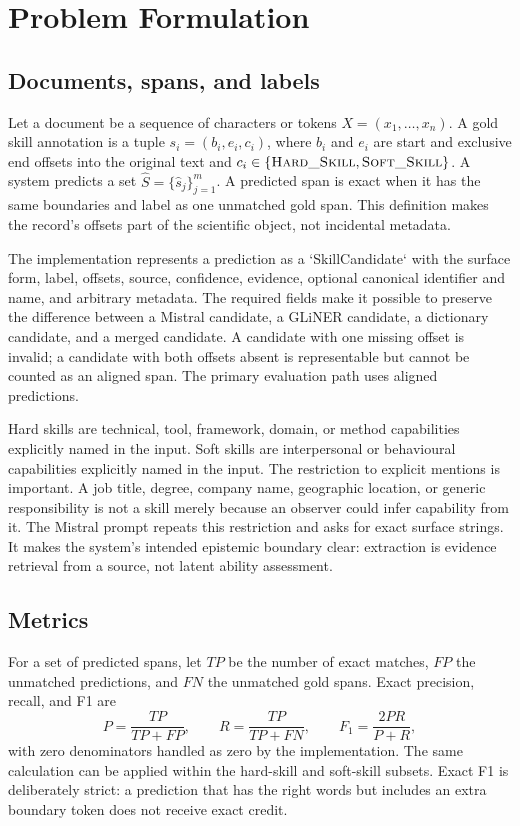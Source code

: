 \chapter{Problem Formulation}
\label{ch:problem}

\section{Documents, spans, and labels}

Let a document be a sequence of characters or tokens $X=(x_1,\ldots,x_n)$. A gold skill annotation is a tuple $s_i=(b_i,e_i,c_i)$, where $b_i$ and $e_i$ are start and exclusive end offsets into the original text and $c_i\in\{\textsc{Hard\_Skill},\textsc{Soft\_Skill}\}$. A system predicts a set $\widehat{S}=\{\hat{s}_j\}_{j=1}^{m}$. A predicted span is exact when it has the same boundaries and label as one unmatched gold span. This definition makes the record's offsets part of the scientific object, not incidental metadata.

The implementation represents a prediction as a `SkillCandidate` with the surface form, label, offsets, source, confidence, evidence, optional canonical identifier and name, and arbitrary metadata. The required fields make it possible to preserve the difference between a Mistral candidate, a GLiNER candidate, a dictionary candidate, and a merged candidate. A candidate with one missing offset is invalid; a candidate with both offsets absent is representable but cannot be counted as an aligned span. The primary evaluation path uses aligned predictions.

Hard skills are technical, tool, framework, domain, or method capabilities explicitly named in the input. Soft skills are interpersonal or behavioural capabilities explicitly named in the input. The restriction to explicit mentions is important. A job title, degree, company name, geographic location, or generic responsibility is not a skill merely because an observer could infer capability from it. The Mistral prompt repeats this restriction and asks for exact surface strings. It makes the system's intended epistemic boundary clear: extraction is evidence retrieval from a source, not latent ability assessment.

\section{Metrics}

For a set of predicted spans, let $TP$ be the number of exact matches, $FP$ the unmatched predictions, and $FN$ the unmatched gold spans. Exact precision, recall, and F1 are
\begin{equation}
 P=\frac{TP}{TP+FP},\qquad R=\frac{TP}{TP+FN},\qquad F_1=\frac{2PR}{P+R},
\label{eq:exact-f1}
\end{equation}
with zero denominators handled as zero by the implementation. The same calculation can be applied within the hard-skill and soft-skill subsets. Exact F1 is deliberately strict: a prediction that has the right words but includes an extra boundary token does not receive exact credit.

